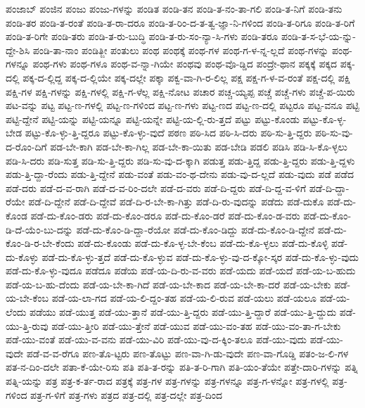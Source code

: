 {ಪಂಜಾಬ್
ಪಂಜಿನ
ಪಂಜು
ಪಂಜು-ಗಳನ್ನು
ಪಂಡಿತ
ಪಂಡಿ-ತನ
ಪಂಡಿ-ತ-ನಂ-ತಾ-ಗಲಿ
ಪಂಡಿ-ತ-ನಿಗೆ
ಪಂಡಿ-ತನು
ಪಂಡಿ-ತರ
ಪಂಡಿ-ತ-ರಂತೆ
ಪಂಡಿ-ತ-ರಾ-ದರೂ
ಪಂಡಿ-ತ-ರಿಂ-ದ-ತ-ತ್ವ-ಜ್ಞಾ-ನಿ-ಗಳಿಂದ
ಪಂಡಿ-ತ-ರಿಗೂ
ಪಂಡಿ-ತ-ರಿಗೆ
ಪಂಡಿ-ತ-ರಿಗೇ
ಪಂಡಿ-ತರು
ಪಂಡಿ-ತ-ರು-ಬುದ್ಧಿ
ಪಂಡಿ-ತ-ರು-ಸಂ-ನ್ಯಾ-ಸಿ-ಗಳು
ಪಂಡಿ-ತರೂ
ಪಂಡಿ-ತ-ಸ-ಭೆ-ಯ-ನ್ನು-ದ್ದೇ-ಶಿಸಿ
ಪಂಡಿ-ತಾ-ನಾಂ
ಪಂಡಿತ್ಜೀ
ಪಂತುಲು
ಪಂಥ
ಪಂಥಕ್ಕೆ
ಪಂಥ-ಗಳ
ಪಂಥ-ಗ-ಳ-ನ್ನ-ಲ್ಲದೆ
ಪಂಥ-ಗಳನ್ನು
ಪಂಥ-ಗಳನ್ನೂ
ಪಂಥ-ಗಳು
ಪಂಥ-ಗಳೂ
ಪಂಥ-ವ-ನ್ನಾ-ಗಿಯೇ
ಪಂಥವು
ಪಂಥ-ವೊ-ಡ್ಡಿದ
ಪಂದ್ರೇ-ಥಾನ
ಪಕ್ಕಕ್ಕೆ
ಪಕ್ಕದ
ಪಕ್ಕ-ದಲ್ಲಿ
ಪಕ್ಕ-ದ-ಲ್ಲಿದ್ದ
ಪಕ್ಕ-ದ-ಲ್ಲಿಯೇ
ಪಕ್ಕ-ದಲ್ಲೇ
ಪಕ್ಕಾ
ಪಕ್ವ-ವಾ-ಗಿ-ರ-ಲಿಲ್ಲ
ಪಕ್ಷ
ಪಕ್ಷ-ಗ-ಳ-ವ-ರಂತೆ
ಪಕ್ಷ-ದಲ್ಲಿ
ಪಕ್ಷಿ
ಪಕ್ಷಿ-ಗಳ
ಪಕ್ಷಿ-ಗಳನ್ನು
ಪಕ್ಷಿ-ಗಳಲ್ಲಿ
ಪಕ್ಷಿ-ಗ-ಳೆಲ್ಲ
ಪಕ್ಷಿ-ನೋಟ
ಪಚಾರ
ಪಚ್ಚ-ಯ್ಯಪ್ಪ
ಪಚ್ಚೆ
ಪಚ್ಚೆ-ಗಳು
ಪಚ್ಚೆ-ಪ-ಯಿರು
ಪಟ-ವನ್ನು
ಪಟ್ಟ
ಪಟ್ಟ-ಣ-ಗಳಲ್ಲಿ
ಪಟ್ಟ-ಣ-ಗಳಿಂದ
ಪಟ್ಟ-ಣ-ಗಳು
ಪಟ್ಟ-ಣದ
ಪಟ್ಟ-ಣ-ದಲ್ಲಿ
ಪಟ್ಟರೂ
ಪಟ್ಟ-ವನೂ
ಪಟ್ಟಿ
ಪಟ್ಟಿ-ದ್ದೇನೆ
ಪಟ್ಟಿ-ಯನ್ನು
ಪಟ್ಟಿ-ಯನ್ನೂ
ಪಟ್ಟಿ-ಯನ್ನೇ
ಪಟ್ಟಿ-ಯ-ಲ್ಲಿ-ರು-ತ್ತದೆ
ಪಟ್ಟು
ಪಟ್ಟು-ಕೊಂಡು
ಪಟ್ಟು-ಕೊ-ಳ್ಳ-ಬೇಡ
ಪಟ್ಟು-ಕೊ-ಳ್ಳು-ತ್ತಿ-ದ್ದರೂ
ಪಟ್ಟು-ಕೊ-ಳ್ಳು-ವುದೆ
ಪಠಣ
ಪಠಿ-ಸಿದ
ಪಠಿ-ಸಿ-ದರು
ಪಠಿ-ಸು-ತ್ತಿ-ದ್ದರು
ಪಠಿ-ಸು-ವು-ದ-ರೊಂ-ದಿಗೆ
ಪಡ-ಬೇ-ಕಾಗಿ
ಪಡ-ಬೇ-ಕಾ-ಗಿಲ್ಲ
ಪಡ-ಬೇ-ಕಾ-ಯಿತು
ಪಡ-ಬೇಡಿ
ಪಡಲಿ
ಪಡಿಸಿ
ಪಡಿ-ಸಿ-ಕೊ-ಳ್ಳಲು
ಪಡಿ-ಸಿ-ದರು
ಪಡಿ-ಸುತ್ತ
ಪಡಿ-ಸು-ತ್ತಿ-ದ್ದರು
ಪಡಿ-ಸು-ವು-ದ-ಕ್ಕಾಗಿ
ಪಡುತ್ತ
ಪಡು-ತ್ತಿದ್ದ
ಪಡು-ತ್ತಿ-ದ್ದರು
ಪಡು-ತ್ತಿ-ದ್ದಳು
ಪಡು-ತ್ತಿ-ದ್ದಾ-ರೆಂದು
ಪಡು-ತ್ತಿ-ದ್ದೇನೆ
ಪಡು-ವಂತೆ
ಪಡು-ವಂ-ಥ-ದೇನು
ಪಡು-ವು-ದ-ಲ್ಲದೆ
ಪಡು-ವುದು
ಪಡೆ
ಪಡೆದ
ಪಡೆ-ದರು
ಪಡೆ-ದ-ವ-ರಾಗಿ
ಪಡೆ-ದ-ವ-ರಿಂ-ದಲೇ
ಪಡೆ-ದ-ವರು
ಪಡೆ-ದಿ-ದ್ದರು
ಪಡೆ-ದಿ-ದ್ದ-ವ-ಳಿಗೆ
ಪಡೆ-ದಿ-ದ್ದಾ-ರೆಯೇ
ಪಡೆ-ದಿ-ದ್ದೇನೆ
ಪಡೆ-ದಿ-ದ್ದೇವೆ
ಪಡೆ-ದಿ-ರ-ಬೇ-ಕಾ-ಗಿತ್ತು
ಪಡೆ-ದಿ-ರು-ವುದನ್ನು
ಪಡೆದು
ಪಡೆ-ದುಕೊ
ಪಡೆ-ದು-ಕೊಂಡ
ಪಡೆ-ದು-ಕೊಂ-ಡರು
ಪಡೆ-ದು-ಕೊಂ-ಡರೂ
ಪಡೆ-ದು-ಕೊಂ-ಡರೆ
ಪಡೆ-ದು-ಕೊಂ-ಡ-ವರು
ಪಡೆ-ದು-ಕೊಂ-ಡಿ-ದೆ-ಯೆಂ-ಬು-ದನ್ನು
ಪಡೆ-ದು-ಕೊಂ-ಡಿ-ದ್ದಾ-ರೆಯೋ
ಪಡೆ-ದು-ಕೊಂ-ಡಿದ್ದು
ಪಡೆ-ದು-ಕೊಂ-ಡಿ-ದ್ದೇನೆ
ಪಡೆ-ದು-ಕೊಂ-ಡಿ-ರ-ಬೇ-ಕೆಂದು
ಪಡೆ-ದು-ಕೊಂಡು
ಪಡೆ-ದು-ಕೊ-ಳ್ಳ-ಬೇ-ಕೆಂಬ
ಪಡೆ-ದು-ಕೊ-ಳ್ಳಲು
ಪಡೆ-ದು-ಕೊಳ್ಳಿ
ಪಡೆ-ದು-ಕೊಳ್ಳು
ಪಡೆ-ದು-ಕೊ-ಳ್ಳು-ತ್ತದೆ
ಪಡೆ-ದು-ಕೊ-ಳ್ಳುವ
ಪಡೆ-ದು-ಕೊ-ಳ್ಳು-ವು-ದ-ಕ್ಕೋ-ಸ್ಕರ
ಪಡೆ-ದು-ಕೊ-ಳ್ಳು-ವುದು
ಪಡೆ-ದು-ಕೊ-ಳ್ಳು-ವುದೂ
ಪಡೆದೂ
ಪಡೆಯ
ಪಡೆ-ಯ-ದಿ-ರು-ವ-ವರು
ಪಡೆ-ಯದು
ಪಡೆ-ಯದೆ
ಪಡೆ-ಯ-ಬ-ಹುದು
ಪಡೆ-ಯ-ಬ-ಹು-ದೆಂದು
ಪಡೆ-ಯ-ಬೇ-ಕಾ-ಗಿದೆ
ಪಡೆ-ಯ-ಬೇ-ಕಾದ
ಪಡೆ-ಯ-ಬೇ-ಕಾ-ದರೆ
ಪಡೆ-ಯ-ಬೇಕು
ಪಡೆ-ಯ-ಬೇ-ಕೆಂಬ
ಪಡೆ-ಯ-ಲಾ-ಗದ
ಪಡೆ-ಯ-ಲಿ-ದ್ದಂ-ತಹ
ಪಡೆ-ಯ-ಲಿ-ರುವ
ಪಡೆ-ಯಲು
ಪಡೆ-ಯಲೂ
ಪಡೆ-ಯ-ಲೆಂದು
ಪಡೆಯು
ಪಡೆ-ಯುತ್ತ
ಪಡೆ-ಯು-ತ್ತಾನೆ
ಪಡೆ-ಯು-ತ್ತಿ-ದ್ದರು
ಪಡೆ-ಯು-ತ್ತಿ-ದ್ದಾರೆ
ಪಡೆ-ಯು-ತ್ತಿ-ದ್ದುದು
ಪಡೆ-ಯು-ತ್ತಿ-ರುವು
ಪಡೆ-ಯು-ತ್ತೀರಿ
ಪಡೆ-ಯು-ತ್ತೇನೆ
ಪಡೆ-ಯುವ
ಪಡೆ-ಯು-ವಂ-ತಹ
ಪಡೆ-ಯು-ವಂ-ತಾ-ಗ-ಬೇಕು
ಪಡೆ-ಯು-ವಂತೆ
ಪಡೆ-ಯು-ವ-ವನು
ಪಡೆ-ಯು-ವಿರಿ
ಪಡೆ-ಯು-ವು-ದ-ಕ್ಕಿಂ-ತಲೂ
ಪಡೆ-ಯು-ವುದು
ಪಡೆ-ಯು-ವುದೇ
ಪಡೆ-ವ-ವ-ರೆಗೂ
ಪಣ-ತೊ-ಟ್ಟರು
ಪಣ-ತೊಟ್ಟು
ಪಣ-ವಾ-ಗಿ-ಡು-ವುದೇ
ಪಣ-ವಾ-ಗೊಡ್ಡಿ
ಪತಂ-ಜ-ಲಿ-ಗಳ
ಪತ-ನ-ದಿಂ-ದಲೇ
ಪತಾ-ಕೆ-ಯೇ-ರಿಸು
ಪತಿ
ಪತಿ-ತ-ರನ್ನು
ಪತಿ-ತ-ರಿ-ಗಾಗಿ
ಪತಿ-ಯಂ-ತೆಯೇ
ಪತ್ತೇ-ದಾರಿ-ಗಳನ್ನು
ಪತ್ನಿ
ಪತ್ನಿ-ಯನ್ನು
ಪತ್ರ
ಪತ್ರ-ಕ-ರ್ತ-ರಾದ
ಪತ್ರಕ್ಕೆ
ಪತ್ರ-ಗಳ
ಪತ್ರ-ಗಳನ್ನು
ಪತ್ರ-ಗಳನ್ನೂ
ಪತ್ರ-ಗ-ಳನ್ನೋ
ಪತ್ರ-ಗಳಲ್ಲಿ
ಪತ್ರ-ಗಳಿಂದ
ಪತ್ರ-ಗ-ಳಿಗೆ
ಪತ್ರ-ಗಳು
ಪತ್ರದ
ಪತ್ರ-ದಲ್ಲಿ
ಪತ್ರ-ದಲ್ಲೇ
ಪತ್ರ-ದಿಂದ
}
